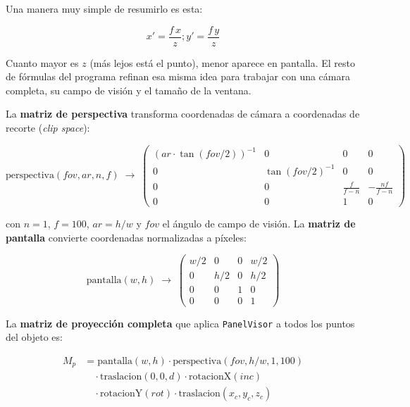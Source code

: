 \documentclass[
  spanish,
  11pt,
  a4paper,
  DIV=11,
  numbers=noendperiod]{scrartcl}
\begin{document}
Una manera muy simple de resumirlo es esta:

\[
x' = \frac{f\,x}{z}; y' = \frac{f\,y}{z}
\]

Cuanto mayor es \(z\) (más lejos está el punto), menor aparece en pantalla. El resto de fórmulas del programa refinan esa misma idea para trabajar con una cámara completa, su campo de visión y el tamaño de la ventana.

\begin{tcolorbox}[enhanced jigsaw, colframe=quarto-callout-tip-color-frame, arc=.35mm, bottomrule=.15mm, left=2mm, breakable, opacityback=0, coltitle=black, bottomtitle=1mm, toptitle=1mm, titlerule=0mm, toprule=.15mm, rightrule=.15mm, title={Detalle técnico opcional}, colbacktitle=quarto-callout-tip-color!10!white, opacitybacktitle=0.6, colback=white, leftrule=.75mm]

La \textbf{matriz de perspectiva} transforma coordenadas de cámara a coordenadas de recorte (\emph{clip space}):

\[
\text{perspectiva}(fov,ar,n,f) \;\to\; \begin{pmatrix} (ar\cdot\tan(fov/2))^{-1} & 0 & 0 & 0 \\ 0 & \tan(fov/2)^{-1} & 0 & 0 \\ 0 & 0 & \frac{f}{f-n} & -\frac{nf}{f-n} \\ 0 & 0 & 1 & 0 \end{pmatrix}
\]

con \(n = 1\), \(f = 100\), \(ar = h/w\) y \(fov\) el ángulo de campo de visión. La \textbf{matriz de pantalla} convierte coordenadas normalizadas a píxeles:

\[
\text{pantalla}(w,h) \;\to\; \begin{pmatrix} w/2 & 0 & 0 & w/2 \\ 0 & h/2 & 0 & h/2 \\ 0 & 0 & 1 & 0 \\ 0 & 0 & 0 & 1 \end{pmatrix}
\]

La \textbf{matriz de proyección completa} que aplica \texttt{PanelVisor} a todos los puntos del objeto es:

\[
\begin{aligned}
M_p &= \text{pantalla}(w,h)\cdot\text{perspectiva}(fov,h/w,1,100) \\
    &\quad\cdot\text{traslacion}(0,0,d)\cdot\text{rotacionX}(inc) \\
    &\quad\cdot\text{rotacionY}(rot)\cdot\text{traslacion}(x_c,y_c,z_c)
\end{aligned}
\]


\end{tcolorbox}
\end{document}
